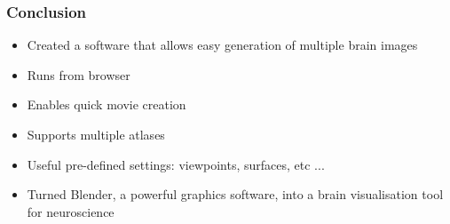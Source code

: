 \documentclass[10pt,xcolor=table,aspectratio=169]{beamer}
\begin{document}
\begin{frame}
 \frametitle{Conclusion}

\begin{itemize}
 \item Created a software that allows easy generation of multiple brain images
 
 \vspace{1em}
 
 \item Runs from browser
 
 \vspace{1em}
 
 \item Enables quick movie creation
 
 \vspace{1em}
 
 \item Supports multiple atlases
 
 \vspace{1em}
 
 \item Useful pre-defined settings: viewpoints, surfaces, etc ...

 \vspace{1em}
 
 \item Turned Blender, a powerful graphics software, into a brain visualisation tool for neuroscience

 
\end{itemize}
 
 
 
\end{frame} 
\end{document}
